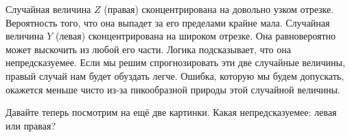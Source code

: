 \documentclass[12pt, a4paper, oneside]{extreport}
\theoremstyle{plain}              %
\theoremstyle{definition}         %
\begin{document}
\begin{figure}[H]
\begin{minipage}[H]{0.49\linewidth}
\end{minipage}
\hfill
\begin{minipage}[H]{0.49\linewidth}
\end{minipage}
\end{figure} 

Случайная величина $Z$ (правая) сконцентрирована на довольно узком отрезке. Вероятность того, что она выпадет за его пределами крайне мала. Случайная величина $Y$ (левая) сконцентрирована на широком отрезке. Она равновероятно может выскочить из любой его части. Логика подсказывает, что она непредсказуемее. Если мы решим спрогнозировать эти две случайные величины, правый случай нам будет обуздать легче. Ошибка, которую мы будем допускать, окажется меньше чисто из-за пикообразной природы этой случайной величины. 

Давайте теперь посмотрим на ещё две картинки. Какая непредсказуемее: левая или правая? 
\end{document}

